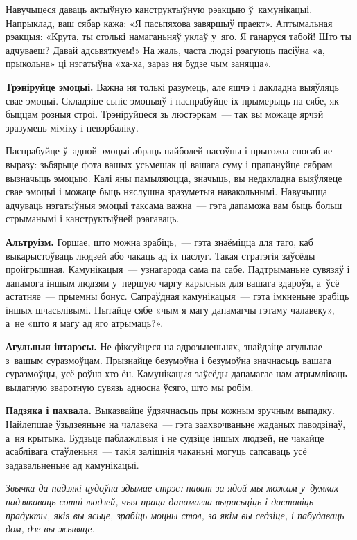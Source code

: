 Навучыцеся даваць актыўную канструктыўную рэакцыю ў~камунікацыі. Напрыклад, ваш сябар кажа: «Я пасьпяхова завяршыў праект». Аптымальная рэакцыя: «Крута, ты столькі намаганьняў уклаў у~яго. Я ганаруся табой! Што ты адчуваеш? Давай адсьвяткуем!» На жаль, часта людзі рэагуюць пасіўна «а, прыкольна» ці нэгатыўна «ха-ха, зараз ня будзе чым заняцца».

\textbf{Трэніруйце эмоцыі.} Важна ня толькі разумець, але яшчэ і дакладна выяўляць свае эмоцыі. Складзіце сьпіс эмоцыяў і паспрабуйце іх прымерыць на сябе, як быццам розныя строі. Трэніруйцеся зь люстэркам~--- так вы можаце ярчэй зразумець міміку і невэрбаліку.


Паспрабуйце ў~адной эмоцыі абраць найболей пасоўны і прыгожы спосаб яе выразу: зьбярыце фота вашых усьмешак ці вашага суму і прапануйце сябрам вызначыць эмоцыю. Калі яны памыляюцца, значыць, вы недакладна выяўляеце свае эмоцыі і можаце быць няслушна зразуметыя навакольнымі. Навучыцца адчуваць нэгатыўныя эмоцыі таксама важна~--- гэта дапаможа вам быць больш стрыманымі і канструктыўней рэагаваць.

\textbf{Альтруізм.} Горшае, што можна зрабіць,~--- гэта знаёміцца для таго, каб выкарыстоўваць людзей або чакаць ад іх паслуг. Такая стратэгія заўсёды пройгрышная. Камунікацыя~--- узнагарода сама па сабе. Падтрыманьне сувязяў і дапамога іншым людзям у~першую чаргу карысныя для вашага здароўя, а~ўсё астатняе~--- прыемны бонус. Сапраўдная камунікацыя~--- гэта імкненьне зрабіць іншых шчасьлівымі. Пытайце сябе «чым я магу дапамагчы гэтаму чалавеку», а~не «што я магу ад яго атрымаць?».

\textbf{Агульныя інтарэсы.} Не фіксуйцеся на адрозьненьнях, знайдзіце агульнае з~вашым суразмоўцам. Прызнайце безумоўна і безумоўна значнасьць вашага суразмоўцы, усё роўна хто ён. Камунікацыя заўсёды дапамагае нам атрымліваць выдатную зваротную сувязь адносна ўсяго, што мы робім.

\textbf{Падзяка і пахвала.} Выказвайце ўдзячнасьць пры кожным зручным выпадку. Найлепшае ўзьдзеяньне на чалавека~--- гэта заахвочваньне жаданых паводзінаў, а~ня крытыка. Будзьце паблажлівыя і не судзіце іншых людзей, не чакайце асаблівага стаўленьня~--- такія залішнія чаканьні могуць сапсаваць усё задавальненьне ад камунікацыі.

\emph{Звычка да падзякі цудоўна здымае стрэс: нават за ядой мы можам у~думках падзякаваць сотні людзей, чыя праца дапамагла вырасьціць і даставіць прадукты, якія вы ясьце, зрабіць моцны стол, за якім вы седзіце, і пабудаваць дом, дзе вы жывяце.}

